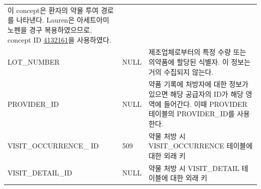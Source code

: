 \documentclass[10.5pt]{book}
\theoremstyle{definition}
\theoremstyle{definition}
\theoremstyle{definition}
\theoremstyle{remark}
\begin{document}
\begin{longtable}[]{@{}lll@{}}
\begin{minipage}[t]{0.48\columnwidth}
이 concept은 환자의 약물 투여 경로를 나타낸다. Lauren은 아세트아미노펜을
경구 복용하였으므로, concept ID
\href{http://athena.ohdsi.org/search-terms/terms/4132161}{4132161}을
사용하였다.\strut
\end{minipage}\tabularnewline
\begin{minipage}[t]{0.28\columnwidth}\raggedright\strut
LOT\_NUMBER\strut
\end{minipage} & \begin{minipage}[t]{0.16\columnwidth}\raggedright\strut
NULL\strut
\end{minipage} & \begin{minipage}[t]{0.48\columnwidth}\raggedright\strut
제조업체로부터의 특정 수량 또는 의약품에 할당된 식별자. 이 정보는 거의
수집되지 않는다.\strut
\end{minipage}\tabularnewline
\begin{minipage}[t]{0.28\columnwidth}\raggedright\strut
PROVIDER\_ID\strut
\end{minipage} & \begin{minipage}[t]{0.16\columnwidth}\raggedright\strut
NULL\strut
\end{minipage} & \begin{minipage}[t]{0.48\columnwidth}\raggedright\strut
약품 기록에 처방자에 대한 정보가 있으면 해당 공급자의 ID가 해당 영역에
들어간다. 이때 PROVIDER 테이블의 PROVIDER\_ID를 사용한다.\strut
\end{minipage}\tabularnewline
\begin{minipage}[t]{0.28\columnwidth}\raggedright\strut
VISIT\_OCCURRENCE\_ ID\strut
\end{minipage} & \begin{minipage}[t]{0.16\columnwidth}\raggedright\strut
509\strut
\end{minipage} & \begin{minipage}[t]{0.48\columnwidth}\raggedright\strut
약물 처방 시 VISIT\_OCCURRENCE 테이블에 대한 외래 키\strut
\end{minipage}\tabularnewline
\begin{minipage}[t]{0.28\columnwidth}\raggedright\strut
VISIT\_DETAIL\_ID\strut
\end{minipage} & \begin{minipage}[t]{0.16\columnwidth}\raggedright\strut
NULL\strut
\end{minipage} & \begin{minipage}[t]{0.48\columnwidth}\raggedright\strut
약물 처방 시 VISIT\_DETAIL 테이블에 대한 외래 키\strut
\end{minipage}\tabularnewline

\end{longtable}
\end{document}
